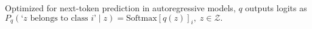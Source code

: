 Optimized for next-token prediction in autoregressive models, $q$ outputs logits as $P_q(\text{`$z$ belongs to class $i$'} \mid z) = \mathrm{Softmax}[q(z)]_i, \; z \in \mathcal{Z}.$

%



%

\vspace{-2mm}
